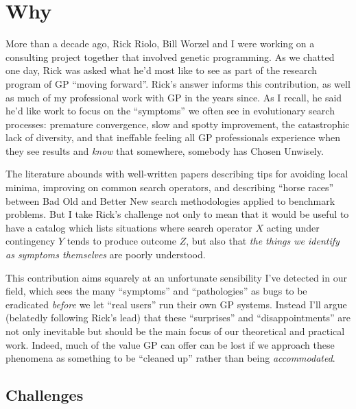 
\section{Why}\hypertarget{why}{}\label{why}

More than a decade ago, Rick Riolo, Bill Worzel and I were working on a consulting project together that involved genetic programming. As we chatted one day, Rick was asked what he'd most like to see as part of the research program of GP ``moving forward''. Rick's answer informs this contribution, as well as much of my professional work with GP in the years since. As I recall, he said he'd like work to focus on the ``symptoms'' we often see in evolutionary search processes: premature convergence, slow and spotty improvement, the catastrophic lack of diversity, and that ineffable feeling all GP professionals experience when they see results and \emph{know} that somewhere, somebody has Chosen Unwisely.

The literature abounds with well-written papers describing tips for avoiding local minima, improving on common search operators, and describing ``horse races'' between Bad Old and Better New search methodologies applied to benchmark problems. But I take Rick's challenge not only to mean that it would be useful to have a catalog which lists situations where search operator $X$ acting under contingency $Y$ tends to produce outcome $Z$, but also that \emph{the things we identify as symptoms themselves} are poorly understood.

This contribution aims squarely at an unfortunate sensibility I've detected in our field, which sees the many ``symptoms'' and ``pathologies'' as bugs to be eradicated \emph{before} we let ``real users'' run their own GP systems. Instead I'll argue (belatedly following Rick's lead) that these ``surprises'' and ``disappointments'' are not only inevitable but should be the main focus of our theoretical and practical work. Indeed, much of the value GP can offer can be lost if we approach these phenomena as something to be ``cleaned up'' rather than being \emph{accommodated}.

\subsection{Challenges}\hypertarget{challenges}{}\label{challenges}

